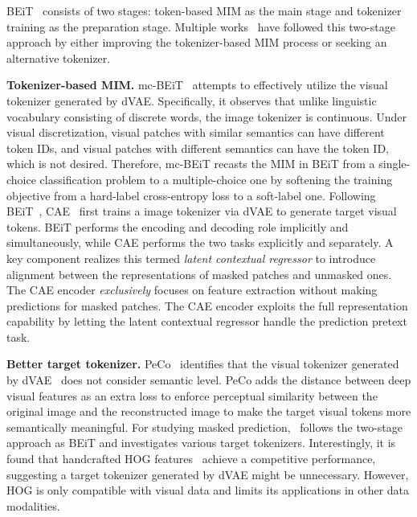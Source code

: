 \documentclass[10pt,journal,compsoc]{IEEEtran}
\begin{document}
BEiT~\cite{bao2022beit} consists of two stages: token-based MIM as the main stage and tokenizer training as the preparation stage. Multiple works~\cite{dong2021peco,li2022mc,chen2022context} have followed this two-stage approach by either improving the tokenizer-based MIM process or seeking an alternative tokenizer.


\textbf{Tokenizer-based MIM.} mc-BEiT~\cite{li2022mc} attempts to effectively utilize the visual tokenizer generated by dVAE. Specifically, it observes that unlike linguistic vocabulary consisting of discrete words, the image tokenizer is continuous. Under visual discretization, visual patches with similar semantics can have different token IDs, and visual patches with different semantics can have the token ID, which is not desired. Therefore, mc-BEiT recasts the MIM in BEiT from a single-choice classification problem to a multiple-choice one by softening the training objective from a hard-label cross-entropy loss to a soft-label one. 
Following BEiT~\cite{bao2022beit}, CAE~\cite{chen2022context} first trains a image tokenizer via dVAE to generate target visual tokens. BEiT performs the encoding and decoding role implicitly and simultaneously, while CAE performs the two tasks explicitly and separately. A key component realizes this termed \textit{latent contextual regressor} to introduce alignment between the representations of masked patches and unmasked ones. The CAE encoder \textit{exclusively} focuses on feature extraction without making predictions for masked patches. The CAE encoder exploits the full representation capability by letting the latent contextual regressor handle the prediction pretext task. 




\textbf{Better target tokenizer.} PeCo~\cite{dong2021peco} identifies that the visual tokenizer generated by dVAE~\cite{ramesh2021zero} does not consider semantic level. PeCo adds the distance between deep visual features as an extra loss to enforce perceptual similarity between the original image and the reconstructed image to make the target visual tokens more semantically meaningful. For studying masked prediction,~\cite{wei2022masked} follows the two-stage approach as BEiT and investigates various target tokenizers. Interestingly, it is found that handcrafted HOG features~\cite{dalal2005histograms} achieve a competitive performance, suggesting a target tokenizer generated by dVAE might be unnecessary. However, HOG is only compatible with visual data and limits its applications in other data modalities. 
\end{document}
